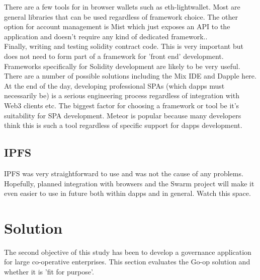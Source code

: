 There are a few tools for in browser wallets such as eth-lightwallet. Most are general libraries that can be used regardless of framework choice. The other option for account management is Mist which just exposes an API to the application and doesn't require any kind of dedicated framework..\\

Finally, writing and testing solidity contract code. This is very important but does not need to form part of a framework for 'front end' development. Frameworks specifically for Solidity development are likely to be very useful. There are a number of possible solutions including the Mix IDE and Dapple here.\\

At the end of the day, developing professional SPAs (which dapps must necessarily be) is a serious engineering process regardless of integration with Web3 clients etc. The biggest factor for choosing a framework or tool be it's suitability for SPA development. Meteor is popular because many developers think this is such a tool regardless of specific support for dapps development.\\

\subsection{IPFS}
IPFS was very straightforward to use and was not the cause of any problems. Hopefully, planned integration with browsers and the Swarm project will make it even easier to use in future both within dapps and in general. Watch this space.\\

\section{Solution}
The second objective of this study has been to develop a governance application for large co-operative enterprises. This section evaluates the Go-op solution and whether it is 'fit for purpose'.\\

